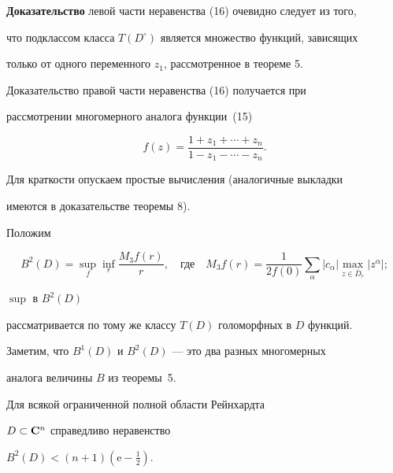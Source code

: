 {\bf Доказательство} левой части неравенства (16) очевидно следует из того,


что подклассом класса $T(D^\circ)$ является множество функций, зависящих


только от одного переменного $z_1$, рассмотренное в теореме 5.


Доказательство правой части неравенства (16) получается при


рассмотрении многомерного аналога функции~(15)


\begin{equation}


f(z)=\frac{1+z_1+\dotsb+z_n}{1-z_1-\dotsb-z_n}.


\end{equation}


Для краткости опускаем простые вычисления (аналогичные выкладки


имеются в доказательстве теоремы 8).





Положим


$$


B^2(D)=\sup\limits_f\inf\limits_r\frac{M_3f(r)}{r}, \quad \text{где}\quad


M_3f(r)=\frac{1}{2f(0)}\sum\limits_{\alpha}|c_{\alpha}|


\max_{z\in{\overline{D}}_r}|z^{\alpha}|;


$$


{$\sup$} в $B^2(D)$


рассматривается по тому же классу $T(D)$ голоморфных в $D$ функций.





Заметим, что $B^1(D)$ и $B^2(D)$ --- это два разных многомерных


аналога величины $B$ из теоремы~5.





\begin{thm}


Для всякой ограниченной полной области Рейнхардта


$D\subset{\bf{C}}^n$ справедливо неравенство


$B^2(D)<(n+1)(\mathrm e-\frac{1}{2})$.


\end{thm}






